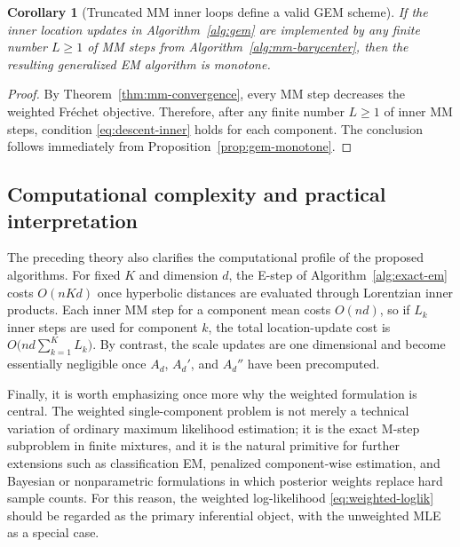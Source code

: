 \documentclass[11pt]{article}
\newtheorem{corollary}[theorem]{Corollary}
\begin{document}
\begin{corollary}[Truncated MM inner loops define a valid GEM scheme]\label{cor:truncated-mm-gem}
If the inner location updates in Algorithm~\ref{alg:gem} are implemented by any finite number \(L\ge 1\) of MM steps from Algorithm~\ref{alg:mm-barycenter}, then the resulting generalized EM algorithm is monotone.
\end{corollary}

\begin{proof}
By Theorem~\ref{thm:mm-convergence}, every MM step decreases the weighted Fr\'echet objective. Therefore, after any finite number \(L\ge 1\) of inner MM steps, condition \eqref{eq:descent-inner} holds for each component. The conclusion follows immediately from Proposition~\ref{prop:gem-monotone}.
\end{proof}

\subsection{Computational complexity and practical interpretation}\label{subsec:complexity}

The preceding theory also clarifies the computational profile of the proposed algorithms. For fixed \(K\) and dimension \(d\), the E-step of Algorithm~\ref{alg:exact-em} costs \(O(nKd)\) once hyperbolic distances are evaluated through Lorentzian inner products. Each inner MM step for a component mean costs \(O(nd)\), so if \(L_k\) inner steps are used for component \(k\), the total location-update cost is \(O\!\bigl(nd\sum_{k=1}^K L_k\bigr)\). By contrast, the scale updates are one dimensional and become essentially negligible once \(A_d\), \(A_d'\), and \(A_d''\) have been precomputed.

Finally, it is worth emphasizing once more why the weighted formulation is central. The weighted single-component problem is not merely a technical variation of ordinary maximum likelihood estimation; it is the exact M-step subproblem in finite mixtures, and it is the natural primitive for further extensions such as classification EM, penalized component-wise estimation, and Bayesian or nonparametric formulations in which posterior weights replace hard sample counts. For this reason, the weighted log-likelihood \eqref{eq:weighted-loglik} should be regarded as the primary inferential object, with the unweighted MLE as a special case.




\end{document}
